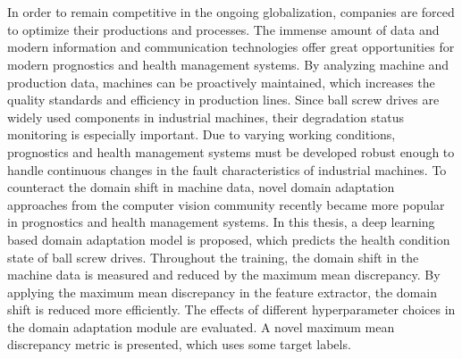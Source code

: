 \chapter{\abstractname}

In order to remain competitive in the ongoing globalization, companies are forced to optimize their productions and processes. The immense amount of data and modern information and communication technologies offer great opportunities for modern prognostics and health management systems. By analyzing machine and production data, machines can be proactively maintained, which increases the quality standards and efficiency in production lines. Since ball screw drives are widely used components in industrial machines, their degradation status monitoring is especially important. Due to varying working conditions, prognostics and health management systems must be developed robust enough to handle continuous changes in the fault characteristics of industrial machines. To counteract the domain shift in machine data, novel domain adaptation approaches from the computer vision community recently became more popular in prognostics and health management systems. In this thesis, a deep learning based domain adaptation model is proposed, which predicts the health condition state of ball screw drives. Throughout the training, the domain shift in the machine data is measured and reduced by the maximum mean discrepancy. By applying the maximum mean discrepancy in the feature extractor, the domain shift is reduced more efficiently. The effects of different hyperparameter choices in the domain adaptation module are evaluated. A novel maximum mean discrepancy metric is presented, which uses some target labels. 


\makeatletter
{}
{\renewcommand{\abstractname}{Kurzfassung}}
{\renewcommand{\abstractname}{Abstract}}
\makeatother

\chapter{\abstractname}

